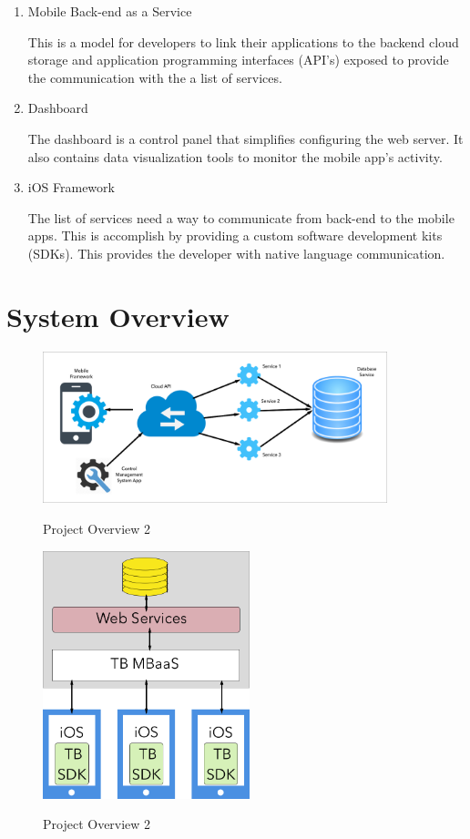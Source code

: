 \begin{enumerate}
   \item Mobile Back-end as a Service
  
    This is a model for developers to link their applications to the backend cloud storage and application programming interfaces (API's) exposed to provide the communication with the a list of services.
  \item Dashboard
  
    The dashboard is a control panel that simplifies configuring the web server. It also contains data visualization tools to monitor the mobile app's activity.
  \item iOS Framework
  
    The list of services need a way to communicate from back-end to the mobile apps. This is accomplish by providing a custom software development kits (SDKs). This provides the developer with native language communication.
\end{enumerate}

\section{System Overview}

\begin{figure}[h]
    \caption{Project Overview 2}
    \centering
    \includegraphics[width=100mm]{images/overview}
    \label{fig:project_overview1}
\end{figure}

\begin{figure}[h]
    \caption{Project Overview 2}
    \centering
    \includegraphics[width=60mm]{images/app_overview}
    \label{fig:project_overview2}
\end{figure}

